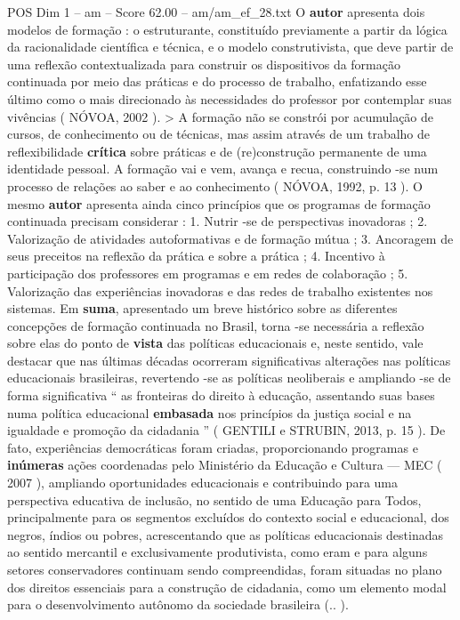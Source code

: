 \begin{textsample}{POS Dim 1 – am – Score 62.00 – am/am\_ef\_28.txt}
O \textbf{autor} apresenta dois modelos de formação : o estruturante, constituído previamente a partir da lógica da racionalidade científica e técnica, e o modelo construtivista, que deve partir de uma reflexão contextualizada para construir os dispositivos da formação continuada por meio das práticas e do processo de trabalho, enfatizando esse último como o mais direcionado às necessidades do professor por contemplar suas vivências ( NÓVOA, 2002 ). > A formação não se constrói por acumulação de cursos, de conhecimento ou de técnicas, mas assim através de um trabalho de reflexibilidade \textbf{crítica} sobre práticas e de (re)construção permanente de uma identidade pessoal.
A formação vai e vem, avança e recua, construindo -se num processo de relações ao saber e ao conhecimento ( NÓVOA, 1992, p. 13 ).
O mesmo \textbf{autor} apresenta ainda cinco princípios que os programas de formação continuada precisam considerar : 1.
Nutrir -se de perspectivas inovadoras ; 2.
Valorização de atividades autoformativas e de formação mútua ; 3.
Ancoragem de seus preceitos na reflexão da prática e sobre a prática ; 4.
Incentivo à participação dos professores em programas e em redes de colaboração ; 5.
Valorização das experiências inovadoras e das redes de trabalho existentes nos sistemas.
Em \textbf{suma}, apresentado um breve histórico sobre as diferentes concepções de formação continuada no Brasil, torna -se necessária a reflexão sobre elas do ponto de \textbf{vista} das políticas educacionais e, neste sentido, vale destacar que nas últimas décadas ocorreram significativas alterações nas políticas educacionais brasileiras, revertendo -se as políticas neoliberais e ampliando -se de forma significativa “ as fronteiras do direito à educação, assentando suas bases numa política educacional \textbf{embasada} nos princípios da justiça social e na igualdade e promoção da cidadania ” ( GENTILI e STRUBIN, 2013, p. 15 ).
De fato, experiências democráticas foram criadas, proporcionando programas e \textbf{inúmeras} ações coordenadas pelo Ministério da Educação e Cultura — MEC ( 2007 ), ampliando oportunidades educacionais e contribuindo para uma perspectiva educativa de inclusão, no sentido de uma Educação para Todos, principalmente para os segmentos excluídos do contexto social e educacional, dos negros, índios ou pobres, acrescentando que as políticas educacionais destinadas ao sentido mercantil e exclusivamente produtivista, como eram e para alguns setores conservadores continuam sendo compreendidas, foram situadas no plano dos direitos essenciais para a construção de cidadania, como um elemento modal para o desenvolvimento autônomo da sociedade brasileira (.. ).

\end{textsample}

